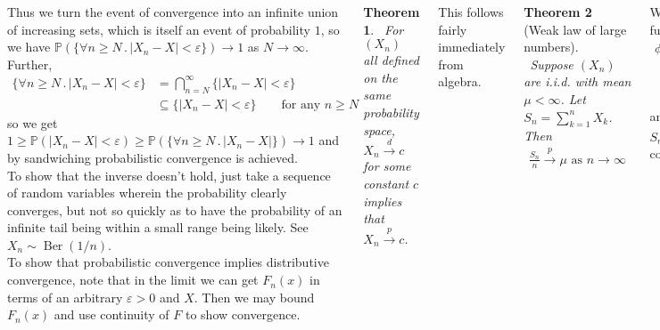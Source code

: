 \documentclass{tikzposter} %
\DeclareMathOperator{\Ber}{Ber}
\newtheorem{theorem}{Theorem}
\begin{document}
\begin{columns}
{  Thus we turn the event of convergence into an infinite union of increasing sets, which is itself an event of probability $1$, so we have $\mathbb{P}(\{\forall n \ge N \,.\, |X_{n} - X| < \varepsilon\}) \to 1$ as $N \to \infty$. Further,
  \begin{align*}
    \{\forall n \ge N \,.\, |X_{n} - X| < \varepsilon\} &= \bigcap_{n=N}^{\infty} \{|X_{n} - X| < \varepsilon\} \\
    &\subseteq \{|X_{n} - X| < \varepsilon\} \quad \quad \text{for any $n \ge N$}
  \end{align*}
  so we get $1 \ge \mathbb{P}(|X_{n} - X| < \varepsilon) \ge \mathbb{P}(\{\forall n \ge N \,.\, |X_{n} - X|\}) \to 1$ and by sandwiching probabilistic convergence is achieved. \\

  To show that the inverse doesn't hold, just take a sequence of random variables wherein the probability clearly converges, but not so quickly as to have the probability of an infinite tail being within a small range being likely. See $X_{n} \sim \Ber(1/n)$. \\

  To show that probabilistic convergence implies distributive convergence, note that in the limit we can get $F_{n}(x)$ in terms of an arbitrary $\varepsilon > 0$ and $X$. Then we may bound $F_{n}(x)$ and use continuity of $F$ to show convergence. \\


  \begin{theorem}
  \ For $(X_{n})$ all defined on the same probability space, $X_{n} \overset{d}{\rightarrow} c$ for some constant $c$ implies that $X_{n} \overset{p}{\rightarrow} c$.
  \end{theorem}
  \hphantom{}

  This follows fairly immediately from algebra. \\

  \begin{theorem}[Weak law of large numbers]
    \ Suppose $(X_{n})$ are i.i.d. with mean $\mu < \infty$. Let $S_{n} = \sum_{k=1}^{n} X_{k}$. Then
    \begin{align*}
      \frac{S_{n}}{n} \overset{p}{\longrightarrow} \mu \,\, \textrm{as $n \to \infty$}
    \end{align*}
  \end{theorem}
  \hphantom{}

  We can prove this statement using characteristic functions:
  \begin{align*}
    \phi_{S_{n}/n}(t) &= \phi_{X}(t/n)^{n} \\
                   &= \left(1+i \mathbb{E}[X] \frac{t}{n} + o(t/n)\right)^{n} \\
    &\to e^{it\mathbb{E}[X]} \quad \quad \text{by continuity of $\exp$ and $\log$}
  \end{align*}
  and by the characteristic function continuity result $S_{n}/n \overset{d}{\to} \mu$, which then means $S_{n}/n \overset{p}{\to} \mu$ as $\mu$ is constant. \\

}
\end{columns}
\end{document}
